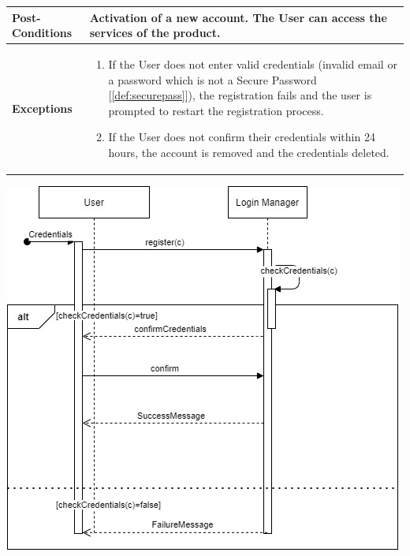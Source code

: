 \documentclass[a4paper, 12pt, oneside]{article}
\begin{document}
\begin{enumerate}[labelindent=20pt, label={UC.\arabic*}, itemindent=1em,leftmargin=!]
\begin{tabularx}{\linewidth}{| l | X |}
	\hline
	\textbf{Post-Conditions} & Activation of a new account. The User can access the services of the product.\\
	
	\hline
	\textbf{Exceptions} & \parbox{0.7\textwidth}{ \begin{enumerate}
			\item If the User does not enter valid credentials (invalid email or a password which is not a Secure Password [\ref{def:securepass}]), the registration fails and the user is prompted to restart the registration process.
			\item If the User does not confirm their credentials within 24 hours, the account is removed and the credentials deleted.
		\end{enumerate}}\\

	\hline
	
\end{tabularx}

\begin{minipage}{\linewidth}
            \centering
           \includegraphics[height=0.5\textheight, scale=1, keepaspectratio]{img/seq_diag/Register.jpg}
\end{minipage}


\end{enumerate}
\end{document}
